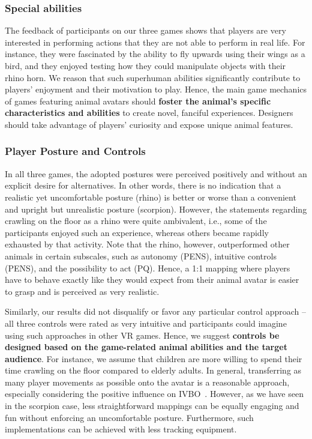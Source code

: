 \documentclass{sigchi}
\begin{document}
\subsubsection{Special abilities}
The feedback of participants on our three games shows that players are very interested in performing actions that they are not able to perform in real life. For instance, they were fascinated by the ability to fly upwards using their wings as a bird, and they enjoyed testing how they could manipulate objects with their rhino horn. 
We reason that such superhuman abilities significantly contribute to players' enjoyment and their motivation to play. Hence, the main game mechanics of games featuring animal avatars should \textbf{foster the animal's specific characteristics and abilities} to create novel, fanciful experiences. Designers should take advantage of players' curiosity and expose unique animal features.



\subsubsection{Player Posture and Controls}

In all three games, the adopted postures were perceived positively and without an explicit desire for alternatives. In other words, there is no indication that a realistic yet uncomfortable posture (rhino) is better or worse than a convenient and upright but unrealistic posture (scorpion). However, the statements regarding crawling on the floor as a rhino were quite ambivalent, i.e., some of the participants enjoyed such an experience, whereas others became rapidly exhausted by that activity. Note that the rhino, however, outperformed other animals in certain subscales, such as autonomy (PENS), intuitive controls (PENS), and the possibility to act (PQ). Hence, a 1:1 mapping where players have to behave exactly like they would expect from their animal avatar is easier to grasp and is perceived as very realistic.

Similarly, our results did not disqualify or favor any particular control approach -- all three controls were rated as very intuitive and participants could imagine using such approaches in other VR games. Hence, we suggest \textbf{controls be designed based on the game-related animal abilities and the target audience}. For instance, we assume that children are more willing to spend their time crawling on the floor compared to elderly adults. In general, transferring as many player movements as possible onto the avatar is a reasonable approach, especially considering the positive influence on IVBO~\cite{sanchez2010virtual}. However, as we have seen in the scorpion case, less straightforward mappings can be equally engaging and fun without enforcing an uncomfortable posture. Furthermore, such implementations can be achieved with less tracking equipment.
\end{document}
